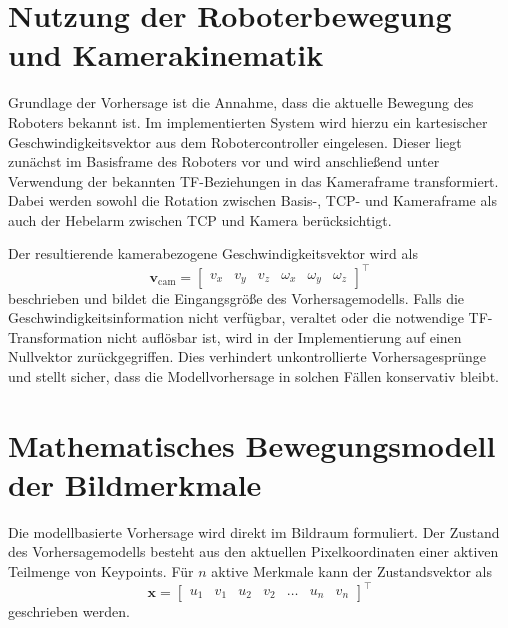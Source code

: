 \newpage
\section{Nutzung der Roboterbewegung und Kamerakinematik}
\label{sec:nutzung_roboterbewegung_kamerakinematik}

Grundlage der Vorhersage ist die Annahme, dass die aktuelle Bewegung des Roboters bekannt ist. Im implementierten System wird hierzu ein kartesischer Geschwindigkeitsvektor aus dem Robotercontroller eingelesen. Dieser liegt zunächst im Basisframe des Roboters vor und wird anschließend unter Verwendung der bekannten \ac{TF}-Beziehungen in das Kameraframe transformiert. Dabei werden sowohl die Rotation zwischen Basis-, \ac{TCP}- und Kameraframe als auch der Hebelarm zwischen \ac{TCP} und Kamera berücksichtigt.

Der resultierende kamerabezogene Geschwindigkeitsvektor wird als
\begin{equation}
\mathbf{v}_{\mathrm{cam}} =
\begin{bmatrix}
v_x & v_y & v_z & \omega_x & \omega_y & \omega_z
\end{bmatrix}^{\top}
\end{equation}
beschrieben und bildet die Eingangsgröße des Vorhersagemodells. Falls die Geschwindigkeitsinformation nicht verfügbar, veraltet oder die notwendige \ac{TF}-Transformation nicht auflösbar ist, wird in der Implementierung auf einen Nullvektor zurückgegriffen. Dies verhindert unkontrollierte Vorhersagesprünge und stellt sicher, dass die Modellvorhersage in solchen Fällen konservativ bleibt.

\section{Mathematisches Bewegungsmodell der Bildmerkmale}
\label{sec:mathematisches_bewegungsmodell_bildmerkmale}

Die modellbasierte Vorhersage wird direkt im Bildraum formuliert. Der Zustand des Vorhersagemodells besteht aus den aktuellen Pixelkoordinaten einer aktiven Teilmenge von Keypoints. Für \(n\) aktive Merkmale kann der Zustandsvektor als
\begin{equation}
\mathbf{x} =
\begin{bmatrix}
u_1 & v_1 & u_2 & v_2 & \dots & u_n & v_n
\end{bmatrix}^{\top}
\end{equation}
geschrieben werden.

